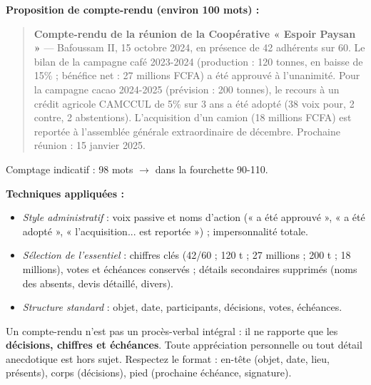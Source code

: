 \documentclass[11pt]{article}
\begin{document}
\begin{corrige}
\textbf{Proposition de compte-rendu (environ 100 mots) :}

\begin{quote}
\textbf{Compte-rendu de la réunion de la Coopérative « Espoir Paysan »} — Bafoussam II, 15 octobre 2024, en présence de 42 adhérents sur 60. Le bilan de la campagne café 2023-2024 (production : 120 tonnes, en baisse de 15\% ; bénéfice net : 27 millions FCFA) a été approuvé à l'unanimité. Pour la campagne cacao 2024-2025 (prévision : 200 tonnes), le recours à un crédit agricole CAMCCUL de 5\% sur 3 ans a été adopté (38 voix pour, 2 contre, 2 abstentions). L'acquisition d'un camion (18 millions FCFA) est reportée à l'assemblée générale extraordinaire de décembre. Prochaine réunion : 15 janvier 2025.
\end{quote}

Comptage indicatif : 98 mots $\rightarrow$ dans la fourchette 90-110.

\textbf{Techniques appliquées :}
\begin{itemize}
    \item \emph{Style administratif} : voix passive et noms d'action (« a été approuvé », « a été adopté », « l'acquisition... est reportée ») ; impersonnalité totale.
    \item \emph{Sélection de l'essentiel} : chiffres clés (42/60 ; 120 t ; 27 millions ; 200 t ; 18 millions), votes et échéances conservés ; détails secondaires supprimés (noms des absents, devis détaillé, divers).
    \item \emph{Structure standard} : objet, date, participants, décisions, votes, échéances.
\end{itemize}
\end{corrige}

\begin{attention}
Un compte-rendu n'est pas un procès-verbal intégral : il ne rapporte que les \textbf{décisions, chiffres et échéances}. Toute appréciation personnelle ou tout détail anecdotique est hors sujet. Respectez le format : en-tête (objet, date, lieu, présents), corps (décisions), pied (prochaine échéance, signature).
\end{attention}
\end{document}
